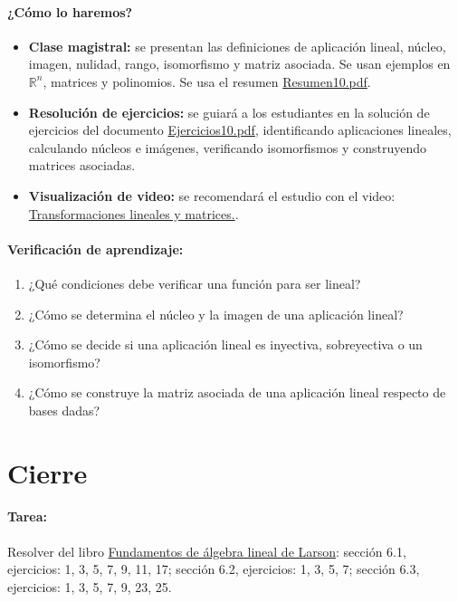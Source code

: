 \documentclass[a4,11pt]{aleph-notas}
\begin{document}
\paragraph{¿Cómo lo haremos?}
\begin{itemize}[leftmargin=*]
    \item \textbf{Clase magistral:} se presentan las definiciones de aplicación lineal, núcleo, imagen, nulidad, rango, isomorfismo y matriz asociada. Se usan ejemplos en $\mathbb{R}^n$, matrices y polinomios. Se usa el resumen \href{https://fcena-puce.github.io/AlgebraLineal-05-N0048/01Resumen/Resumen10.pdf}{Resumen10.pdf}.
    \item \textbf{Resolución de ejercicios:} se guiará a los estudiantes en la solución de ejercicios del documento \href{https://fcena-puce.github.io/AlgebraLineal-05-N0048/04Ejercicios/Ejercicios10.pdf}{Ejercicios10.pdf}, identificando aplicaciones lineales, calculando núcleos e imágenes, verificando isomorfismos y construyendo matrices asociadas.
    \item \textbf{Visualización de video:} se recomendará el estudio con el video: \href{https://youtu.be/kYB8IZa5AuE?si=51z3YxrVrpOQwNTV}{Transformaciones lineales y matrices.}.
\end{itemize}

\paragraph{Verificación de aprendizaje:}
\begin{enumerate}[leftmargin=*]
    \item ¿Qué condiciones debe verificar una función para ser lineal?
    \item ¿Cómo se determina el núcleo y la imagen de una aplicación lineal?
    \item ¿Cómo se decide si una aplicación lineal es inyectiva, sobreyectiva o un isomorfismo?
    \item ¿Cómo se construye la matriz asociada de una aplicación lineal respecto de bases dadas?
\end{enumerate}

\section*{Cierre}

\paragraph{Tarea:}
Resolver del libro \href{https://catalogobiblioteca.puce.edu.ec/cgi-bin/koha/opac-detail.pl?biblionumber=86081}{Fundamentos de álgebra lineal de Larson}: sección 6.1, ejercicios: 1, 3, 5, 7, 9, 11, 17; sección 6.2, ejercicios: 1, 3, 5, 7; sección 6.3, ejercicios: 1, 3, 5, 7, 9, 23, 25.
\end{document}
